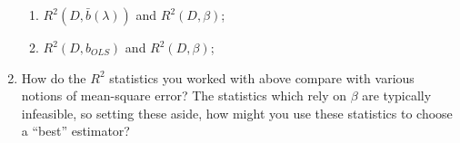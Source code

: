 \documentclass[12pt]{amsart}
\begin{document}
\begin{enumerate}
\begin{enumerate}
\item \(R^2(D,\bar{b}(\lambda))\) and \(R^2(D,\beta)\);

\item \(R^2(D,b_{OLS})\) and \(R^2(D,\beta)\);
\end{enumerate}

\item How do the \(R^2\) statistics you worked with above compare with
various notions of mean-square error?  The statistics which rely
on \(\beta\) are typically infeasible, so setting these aside, how
might you use these statistics to choose a ``best'' estimator?
\end{enumerate}
\end{document}
